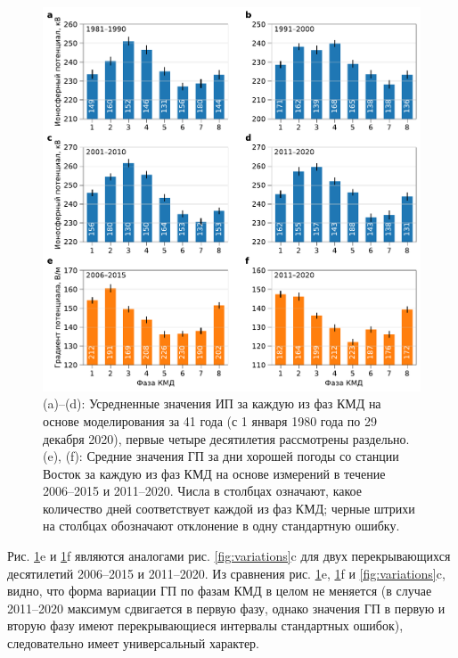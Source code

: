 \begin{figure}[htbp]
    \centering
    \includegraphics[width=\textwidth]{figures/ip_pg_variation_partial.pdf}
    \caption{(a)--(d): Усредненные значения ИП за каждую из фаз КМД на основе моделирования за 41 года (с 1 января 1980 года по 29 декабря 2020), первые четыре десятилетия рассмотрены раздельно. (e), (f): Средние значения ГП за дни хорошей погоды со станции Восток за каждую из фаз КМД на основе измерений в течение 2006--2015 и 2011--2020. Числа в столбцах означают, какое количество дней соответствует каждой из фаз КМД; черные штрихи на столбцах обозначают отклонение в одну стандартную ошибку.}
    \label{fig:ip_pg_variation_partial}
\end{figure}

Рис. \ref{fig:ip_pg_variation_partial}{e} и \ref{fig:ip_pg_variation_partial}{f} являются аналогами рис. \ref{fig:variations}{c} для двух перекрывающихся десятилетий 2006--2015 и 2011--2020. Из сравнения рис. \ref{fig:ip_pg_variation_partial}{e}, \ref{fig:ip_pg_variation_partial}{f} и \ref{fig:variations}{c}, видно, что форма вариации ГП по фазам КМД в целом не меняется (в случае 2011--2020 максимум сдвигается в первую фазу, однако значения ГП в первую и вторую фазу имеют перекрывающиеся интервалы стандартных ошибок), следовательно имеет универсальный характер.

